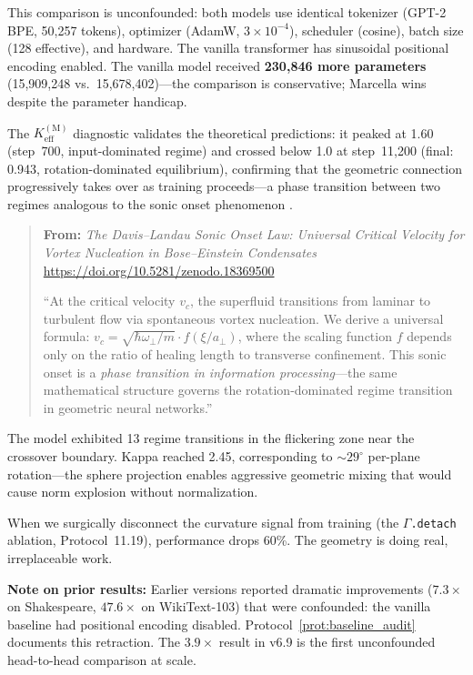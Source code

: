 \documentclass[11pt,a4paper]{article}
\theoremstyle{definition}
\theoremstyle{remark}
\begin{document}
This comparison is unconfounded: both models use identical tokenizer (GPT-2 BPE, 50,257 tokens), optimizer (AdamW, $3 \times 10^{-4}$), scheduler (cosine), batch size (128 effective), and hardware. The vanilla transformer has sinusoidal positional encoding enabled. The vanilla model received \textbf{230,846 more parameters} (15,909,248 vs.~15,678,402)---the comparison is conservative; Marcella wins despite the parameter handicap.

The $K_{\mathrm{eff}}^{(\mathrm{M})}$ diagnostic validates the theoretical predictions: it peaked at 1.60 (step~700, input-dominated regime) and crossed below 1.0 at step~11,200 (final: 0.943, rotation-dominated equilibrium), confirming that the geometric connection progressively takes over as training proceeds---a phase transition between two regimes analogous to the sonic onset phenomenon \cite{davis2026landau}.

\begin{quote}
\small
\textbf{From:} \emph{The Davis--Landau Sonic Onset Law: Universal Critical Velocity for Vortex Nucleation in Bose--Einstein Condensates} \cite{davis2026landau}\\
\url{https://doi.org/10.5281/zenodo.18369500}

\medskip
``At the critical velocity $v_c$, the superfluid transitions from laminar to turbulent flow via spontaneous vortex nucleation. We derive a universal formula: $v_c = \sqrt{\hbar \omega_\perp / m} \cdot f(\xi/a_\perp)$, where the scaling function $f$ depends only on the ratio of healing length to transverse confinement. This sonic onset is a \emph{phase transition in information processing}---the same mathematical structure governs the rotation-dominated regime transition in geometric neural networks.''
\end{quote}

The model exhibited 13 regime transitions in the flickering zone near the crossover boundary. Kappa reached 2.45, corresponding to $\sim29^\circ$ per-plane rotation---the sphere projection enables aggressive geometric mixing that would cause norm explosion without normalization.

When we surgically disconnect the curvature signal from training (the $\Gamma$\texttt{.detach} ablation, Protocol~11.19), performance drops 60\%. The geometry is doing real, irreplaceable work.

\textbf{Note on prior results:} Earlier versions reported dramatic improvements ($7.3\times$ on Shakespeare, $47.6\times$ on WikiText-103) that were confounded: the vanilla baseline had positional encoding disabled. Protocol~\ref{prot:baseline_audit} documents this retraction. The $3.9\times$ result in v6.9 is the first unconfounded head-to-head comparison at scale.
\end{document}
